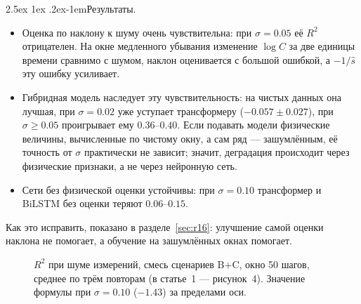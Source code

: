 \documentclass[12pt,a4paper]{report}
\makeatletter
\renewcommand\paragraph{\@startsection{paragraph}{4}{\z@}%
  {2.5ex \@plus1ex \@minus.2ex}{-1em}{\normalfont\normalsize\bfseries}}
\numberwithin{equation}{chapter}
\makeatother
\begin{document}
\paragraph{Результаты.}
\begin{itemize}
\item Оценка по наклону к шуму очень чувствительна: при $\sigma=0.05$ её
      $R^2$ отрицателен. На окне медленного убывания изменение $\log C$ за
      две единицы времени сравнимо с шумом, наклон оценивается с большой
      ошибкой, а $-1/\hat s$ эту ошибку усиливает.
\item Гибридная модель наследует эту чувствительность: на чистых данных она
      лучшая, при $\sigma=0.02$ уже уступает трансформеру
      ($-0.057\pm0.027$), при $\sigma\ge0.05$ проигрывает ему $0.36$--$0.40$.
      Если подавать модели физические величины, вычисленные по чистому окну,
      а сам ряд --- зашумлённым, её точность от $\sigma$ практически не
      зависит; значит, деградация происходит через физические признаки, а
      не через нейронную сеть.
\item Сети без физической оценки устойчивы: при $\sigma=0.10$ трансформер и
      BiLSTM без оценки теряют $0.06$--$0.15$.
\end{itemize}
Как это исправить, показано в разделе~\ref{sec:r16}: улучшение самой
оценки наклона не помогает, а обучение на зашумлённых окнах помогает.

\begin{figure}[h]
\centering
{}
\caption{$R^2$ при шуме измерений, смесь сценариев B$+$C, окно 50 шагов,
среднее по трём повторам (в статье~1 --- рисунок~4). Значение формулы при
$\sigma=0.10$ ($-1.43$) за пределами оси.}
\label{fig:noise1}
\end{figure}
\end{document}
